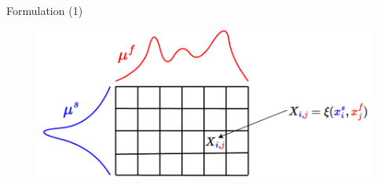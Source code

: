 \documentclass{beamer}
\begin{document}
\begin{frame}{Formulation (1)}
  \vspace{-0.3cm}
  \begin{minipage}[t]{0.6\linewidth}
  \end{minipage}%
  \hfill%
  \begin{minipage}[t]{0.8\linewidth}
  \begin{figure}
    \centering
    \includegraphics[width=\linewidth, keepaspectratio=true]{OT_new/coot_matrix_single.pdf}
  \end{figure}
  \end{minipage}

\end{frame}
\end{document}
